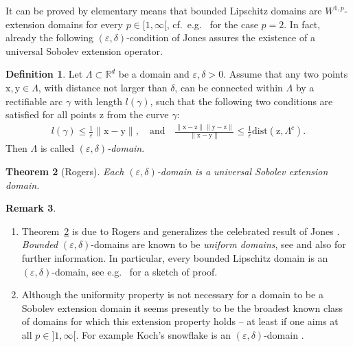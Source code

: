 \documentclass[10pt,leqno]{amsart}
\newtheorem{theorem}{Theorem}[section]
\theoremstyle{definition}
\newtheorem{definition}[theorem]{Definition}
\newtheorem{remark}[theorem]{Remark}
\numberwithin{equation}{section}
\begin{document}
It can be proved by elementary means that bounded Lipschitz domains are
$W^{1,p}$-extension domains for every $p \in [1,\infty[$, cf.\ e.g.\
\cite{Giusti} for the case $p=2$. In fact, already the following
$({\varepsilon},\delta)$-condition of Jones \cite{jones} assures the existence of a
universal Sobolev extension operator. 

\begin{definition} \label{d-Jones}
 Let $\Lambda \subset {{\mathbb R}}^d$ be a domain and $\varepsilon, \delta >0$. Assume
 that any two points ${{\mathrm x}}, \mathrm y \in \Lambda$, with distance not
 larger than $\delta$, can be connected within $\Lambda$ by a rectifiable arc
 $\gamma$ with length $l(\gamma)$, such that the following two conditions are
 satisfied for all points $\mathrm z$ from the curve $\gamma$:
 \begin{align*}
 l(\gamma) \le \frac{1}{\varepsilon } \|{{\mathrm x}} - \mathrm y\|, \quad
	\text{and} \quad
	\frac{\|{{\mathrm x}} - \mathrm z\| \|\mathrm y -\mathrm z\|}
		{\|{{\mathrm x}} -\mathrm y\|}
	\le \frac{1}{\varepsilon} \mathrm{dist}(\mathrm z, \Lambda^c).
 \end{align*}
 Then $\Lambda$ is called \emph{$(\varepsilon, \delta)$-domain}.
\end{definition}

\begin{theorem}[Rogers] \label{t-Rogers}
 Each $(\varepsilon,\delta)$-domain is a universal Sobolev extension domain.
\end{theorem}

\begin{remark} \label{r-uniform}
\begin{enumerate}
 \item Theorem~\ref{t-Rogers} is due to Rogers \cite{rogers} and generalizes the
celebrated result of Jones \cite{jones}. \emph{Bounded}
$(\varepsilon,\delta)$-domains are known  to be \emph{uniform domains}, see
\cite[Ch.~4.2]{Vai} and also \cite{jones, martio, martiosarv, martin} for
further information. In particular, every bounded Lipschitz
domain is an $({\varepsilon},\delta)$-domain, see e.g.\
\cite[Rem.~5.11]{Darmstadt_KatoMixed} for a sketch of proof.
 \item Although the uniformity property is not necessary for a domain to be a
Sobolev extension domain \cite{Yang} it seems presently to be the broadest known
class of domains for which this extension property holds -- at least if one aims
at all $p \in {]1,\infty[}$. For example Koch's snowflake is an
$(\varepsilon,\delta)$-domain \cite{jones}.
\end{enumerate}
\end{remark}
\end{document}
